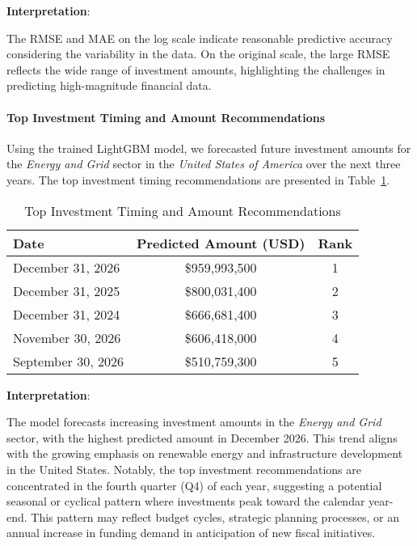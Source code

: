 \documentclass[sigconf]{acmart}
\begin{document}
\textbf{Interpretation}:

The RMSE and MAE on the log scale indicate reasonable predictive accuracy considering the variability in the data. On the original scale, the large RMSE reflects the wide range of investment amounts, highlighting the challenges in predicting high-magnitude financial data.

\paragraph{Top Investment Timing and Amount Recommendations}

Using the trained LightGBM model, we forecasted future investment amounts for the \textit{Energy and Grid} sector in the \textit{United States of America} over the next three years. The top investment timing recommendations are presented in Table~\ref{tab:investment_recommendations}.

\begin{table}[htpb]
    \centering
    \caption{Top Investment Timing and Amount Recommendations}
    \label{tab:investment_recommendations}
    \begin{tabular}{lcc}
        \toprule
        \textbf{Date} & \textbf{Predicted Amount (USD)} & \textbf{Rank} \\
        \midrule
        December 31, 2026 & \$959,993,500 & 1 \\
        December 31, 2025 & \$800,031,400 & 2 \\
        December 31, 2024 & \$666,681,400 & 3 \\
        November 30, 2026 & \$606,418,000 & 4 \\
        September 30, 2026 & \$510,759,300 & 5 \\
        \bottomrule
    \end{tabular}
\end{table}

\textbf{Interpretation}:

The model forecasts increasing investment amounts in the \textit{Energy and Grid} sector, with the highest predicted amount in December 2026. This trend aligns with the growing emphasis on renewable energy and infrastructure development in the United States. Notably, the top investment recommendations are concentrated in the fourth quarter (Q4) of each year, suggesting a potential seasonal or cyclical pattern where investments peak toward the calendar year-end. This pattern may reflect budget cycles, strategic planning processes, or an annual increase in funding demand in anticipation of new fiscal initiatives.
\end{document}
